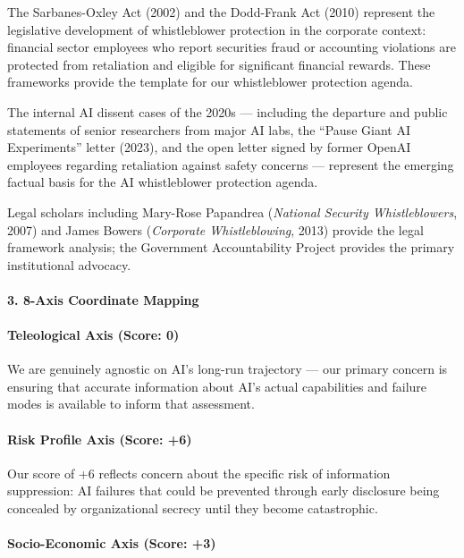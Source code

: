 The Sarbanes-Oxley Act (2002) and the Dodd-Frank Act (2010) represent
the legislative development of whistleblower protection in the corporate
context: financial sector employees who report securities fraud or
accounting violations are protected from retaliation and eligible for
significant financial rewards. These frameworks provide the template for
our whistleblower protection agenda.

The internal AI dissent cases of the 2020s --- including the departure
and public statements of senior researchers from major AI labs, the
``Pause Giant AI Experiments'' letter (2023), and the open letter signed
by former OpenAI employees regarding retaliation against safety concerns
--- represent the emerging factual basis for the AI whistleblower
protection agenda.

Legal scholars including Mary-Rose Papandrea (\emph{National Security
Whistleblowers}, 2007) and James Bowers (\emph{Corporate
Whistleblowing}, 2013) provide the legal framework analysis; the
Government Accountability Project provides the primary institutional
advocacy.

\paragraph{3. 8-Axis Coordinate
Mapping}\label{axis-coordinate-mapping-7}

\paragraph{Teleological Axis (Score:
0)}\label{teleological-axis-score-0}

We are genuinely agnostic on AI's long-run trajectory --- our primary
concern is ensuring that accurate information about AI's actual
capabilities and failure modes is available to inform that assessment.

\paragraph{Risk Profile Axis (Score:
+6)}\label{risk-profile-axis-score-6-2}

Our score of +6 reflects concern about the specific risk of information
suppression: AI failures that could be prevented through early
disclosure being concealed by organizational secrecy until they become
catastrophic.

\paragraph{Socio-Economic Axis (Score:
+3)}\label{socio-economic-axis-score-3}

